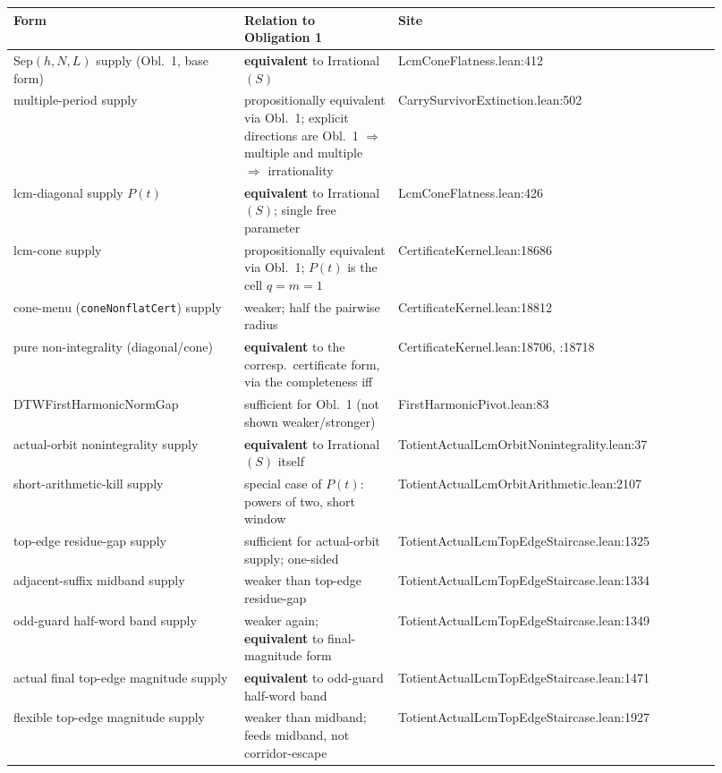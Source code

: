 \documentclass[11pt]{article}
\theoremstyle{plain}
\theoremstyle{definition}
\theoremstyle{remark}
\begin{document}
\begin{center}
\begin{longtable}{p{0.30\linewidth} p{0.20\linewidth} p{0.42\linewidth}}
\textbf{Form} & \textbf{Relation to Obligation 1} & \textbf{Site} \\
\hline
\endhead
Sep$(h,N,L)$ supply (Obl.\ 1, base form) & \textbf{equivalent} to Irrational$(S)$ & LcmConeFlatness.lean:412 \\
multiple-period supply & propositionally equivalent via Obl.\ 1; explicit directions are Obl.\ 1 $\Rightarrow$ multiple and multiple $\Rightarrow$ irrationality & CarrySurvivorExtinction.lean:502 \\
lcm-diagonal supply $P(t)$ & \textbf{equivalent} to Irrational$(S)$; single free parameter & LcmConeFlatness.lean:426 \\
lcm-cone supply & propositionally equivalent via Obl.\ 1; $P(t)$ is the cell $q{=}m{=}1$ & CertificateKernel.lean:18686 \\
cone-menu (\texttt{coneNonflatCert}) supply & weaker; half the pairwise radius & CertificateKernel.lean:18812 \\
pure non-integrality (diagonal/cone) & \textbf{equivalent} to the corresp.\ certificate form, via the completeness iff & CertificateKernel.lean:18706, :18718 \\
DTWFirstHarmonicNormGap & sufficient for Obl.\ 1 (not shown weaker/stronger) & FirstHarmonicPivot.lean:83 \\
actual-orbit nonintegrality supply & \textbf{equivalent} to Irrational$(S)$ itself & TotientActualLcmOrbitNonintegrality.lean:37 \\
short-arithmetic-kill supply & special case of $P(t)$: powers of two, short window & TotientActualLcmOrbitArithmetic.lean:2107 \\
top-edge residue-gap supply & sufficient for actual-orbit supply; one-sided & TotientActualLcmTopEdgeStaircase.lean:1325 \\
adjacent-suffix midband supply & weaker than top-edge residue-gap & TotientActualLcmTopEdgeStaircase.lean:1334 \\
odd-guard half-word band supply & weaker again; \textbf{equivalent} to final-magnitude form & TotientActualLcmTopEdgeStaircase.lean:1349 \\
actual final top-edge magnitude supply & \textbf{equivalent} to odd-guard half-word band & TotientActualLcmTopEdgeStaircase.lean:1471 \\
flexible top-edge magnitude supply & weaker than midband; feeds midband, not corridor-escape & TotientActualLcmTopEdgeStaircase.lean:1927 \\

\end{longtable}
\end{center}
\end{document}
